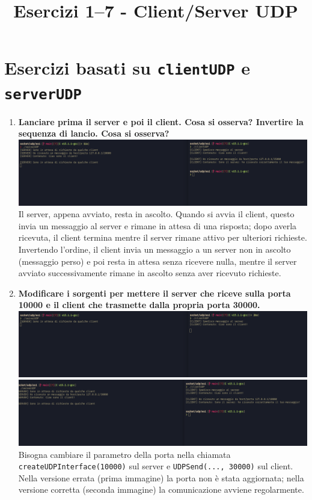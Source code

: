 \documentclass[a4paper,12pt]{article}
\title{Esercizi 1--7 - Client/Server UDP}
\author{}
\date{}
\begin{document}
\maketitle

\section*{Esercizi basati su \texttt{clientUDP} e \texttt{serverUDP}}

\begin{enumerate}
  \item \textbf{Lanciare prima il server e poi il client. Cosa si osserva? Invertire la sequenza di lancio. Cosa si osserva?}\\
    \includegraphics[width=0.7\linewidth]{server_client.png}\\
    Il server, appena avviato, resta in ascolto. Quando si avvia il client, questo invia un messaggio al server e rimane in attesa di una risposta; dopo averla ricevuta, il client termina mentre il server rimane attivo per ulteriori richieste. Invertendo l'ordine, il client invia un messaggio a un server non in ascolto (messaggio perso) e poi resta in attesa senza ricevere nulla, mentre il server avviato successivamente rimane in ascolto senza aver ricevuto richieste.

  \item \textbf{Modificare i sorgenti per mettere il server che riceve sulla porta 10000 e il client che trasmette dalla propria porta 30000.}\\
    \includegraphics[width=0.7\linewidth]{cambio_porta_err.png}\\
    \includegraphics[width=0.7\linewidth]{cambio_porta.png}\\
    Bisogna cambiare il parametro della porta nella chiamata \texttt{createUDPInterface(10000)} sul server e \texttt{UDPSend(..., 30000)} sul client. Nella versione errata (prima immagine) la porta non è stata aggiornata; nella versione corretta (seconda immagine) la comunicazione avviene regolarmente.


\end{enumerate}
\end{document}

